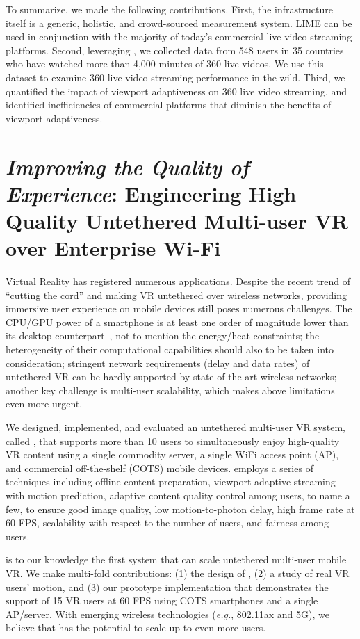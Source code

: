 To summarize, we made the following contributions. First, the \lime infrastructure itself is a generic, holistic, and crowd-sourced measurement system.
LIME can be used in conjunction with the majority of today’s commercial live video streaming platforms. 
Second, leveraging \lime, we collected data from 548 users in 35 countries who have watched more than 4,000 minutes of 360\degree{} live videos. We use this dataset to examine 360\degree{} live video streaming performance in the wild.
Third, we quantified the impact of viewport adaptiveness on 360\degree{} live video streaming, and identified inefficiencies of commercial platforms that diminish the benefits of viewport adaptiveness.


\section{\emph{Improving the Quality of Experience}: Engineering High Quality Untethered Multi-user VR over Enterprise Wi-Fi}
Virtual Reality has registered numerous applications. Despite the recent trend of ``cutting the cord'' and making VR untethered over wireless networks, providing immersive user experience on mobile devices still poses numerous challenges. 
The CPU/GPU power of a smartphone is at least one order of magnitude lower than its desktop counterpart~\cite{satyanarayanan2019computing}, not to mention the energy/heat constraints;
the heterogeneity of their computational capabilities should also to be taken into consideration;
stringent network requirements (delay and data rates) of untethered VR can be hardly supported by state-of-the-art wireless networks;
another key challenge is multi-user scalability, which makes above limitations even more urgent. 

We designed, implemented, and evaluated an untethered multi-user VR system, called \firefly, that supports more than 10 users to simultaneously enjoy high-quality VR content using a single commodity server, a single WiFi access point (AP), and commercial off-the-shelf (COTS) mobile devices. 
\firefly employs a series of techniques including offline content preparation,
viewport-adaptive streaming with motion prediction, adaptive
content quality control among users, to name a few, to ensure
good image quality, low motion-to-photon delay, high frame
rate at 60 FPS, scalability with respect to the number of users,
and fairness among users.

\firefly is to our knowledge the first system that can scale
untethered multi-user mobile VR. We make multi-fold contributions:
(1) the design of \firefly, (2) a study of real VR users’ motion, and
(3) our prototype implementation that demonstrates the support of 15 VR 
users at 60 FPS using COTS smartphones and a single AP/server. With emerging
wireless technologies (\emph{e.g.}, 802.11ax and 5G), we believe that \firefly has 
the potential to scale up to even more users.



